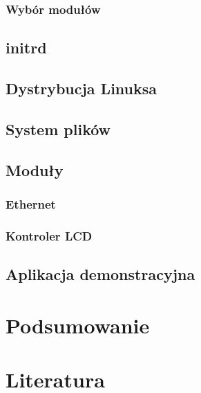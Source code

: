 \documentclass[a4paper]{article}
\begin{document}
			\subsubsection{Wybór modułów}
		\subsection{initrd}
		\subsection{Dystrybucja Linuksa}
		\subsection{System plików}
		\subsection{Moduły}
			\subsubsection{Ethernet}
			\subsubsection{Kontroler LCD}
		\subsection{Aplikacja demonstracyjna}
		
	\section{Podsumowanie}
	\section{Literatura}
\end{document}
